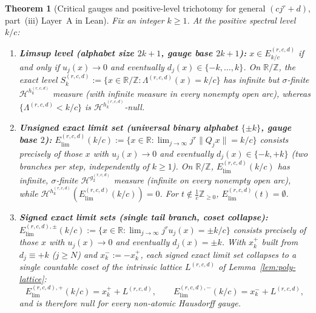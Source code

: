 \documentclass[11pt]{article}
\newtheorem{theorem}{Theorem}
\theoremstyle{definition}
\theoremstyle{remark}
\newcommand{\R}{\mathbb{R}}
\newcommand{\Z}{\mathbb{Z}}
\newcommand{\Lam}{\Lambda}
\begin{document}
\begin{theorem}[Critical gauges and positive-level trichotomy for general $(cj^r+d)$, part~(iii) Layer~A in Lean]\label{thm:poly-gauge-trichotomy}
Fix an integer $k\ge1$. At the positive spectral level $k/c$:
\begin{enumerate}[label=(\roman*),leftmargin=2em]
\item \textbf{Limsup level (alphabet size $2k+1$, gauge base $2k+1$):}
$x\in E_{k/c}^{(r,c,d)}$ if and only if $u_j(x)\to0$ and eventually
$d_j(x)\in\{-k,\dots,k\}$. On $\R/\Z$, the exact level
$S_k^{(r,c,d)}:=\{x\in\R/\Z:\Lam^{(r,c,d)}(x)=k/c\}$ has infinite but
$\sigma$-finite $\mathcal H^{h_k^{(r,c,d)}}$ measure (with infinite measure in
every nonempty open arc), whereas $\{\Lam^{(r,c,d)}<k/c\}$ is
$\mathcal H^{h_k^{(r,c,d)}}$-null.
\item \textbf{Unsigned exact limit set (universal binary alphabet $\{\pm k\}$, gauge base $2$):}
$E_{\mathrm{lim}}^{(r,c,d)}(k/c):=\{x\in\R:\lim_{j\to\infty}j^r\|Q_jx\|=k/c\}$
consists precisely of those $x$ with $u_j(x)\to0$ and eventually
$d_j(x)\in\{-k,+k\}$ (two branches per step, independently of $k\ge1$). On
$\R/\Z$, $E_{\mathrm{lim}}^{(r,c,d)}(k/c)$ has infinite, $\sigma$-finite
$\mathcal H^{g_2^{(r,c,d)}}$ measure (infinite on every nonempty open arc),
while $\mathcal H^{h_k^{(r,c,d)}}(E_{\mathrm{lim}}^{(r,c,d)}(k/c))=0$. For
$t\notin\frac1c\Z_{\ge0}$, $E_{\mathrm{lim}}^{(r,c,d)}(t)=\emptyset$.
\item \textbf{Signed exact limit sets (single tail branch, coset collapse):}
$E_{\mathrm{lim}}^{(r,c,d),\pm}(k/c):=\{x\in\R:\lim_{j\to\infty}j^ru_j(x)=\pm k/c\}$
consists precisely of those $x$ with $u_j(x)\to0$ and eventually $d_j(x)=\pm k$.
With $x_k^+$ built from $d_j\equiv+k$ ($j\ge N$) and $x_k^-:=-x_k^+$, each signed
exact limit set collapses to a single countable coset of the intrinsic lattice
$L^{(r,c,d)}$ of Lemma~\ref{lem:poly-lattice}:
\[
E_{\mathrm{lim}}^{(r,c,d),+}(k/c)=x_k^+ + L^{(r,c,d)},\qquad
E_{\mathrm{lim}}^{(r,c,d),-}(k/c)=x_k^- + L^{(r,c,d)},
\]
and is therefore null for every non-atomic Hausdorff gauge.
\end{enumerate}
\end{theorem}
\end{document}
